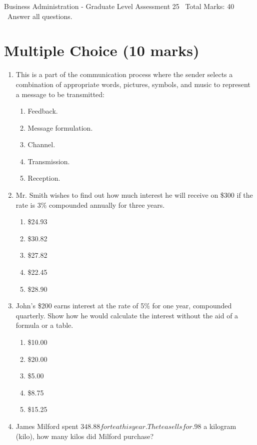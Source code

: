 \documentclass[12pt]{article}
\begin{document}
\begin{center}
Business Administration - Graduate Level Assessment 25 \
Total Marks: 40 \
Answer all questions.
\end{center}

\section*{Multiple Choice (10 marks)}
\begin{enumerate}[label=\arabic*.]
\item This is a part of the communication process where the sender selects a combination of appropriate words, pictures, symbols, and music to represent a message to be transmitted:
\begin{enumerate}[label=(\alph*)]
    \item Feedback.
    \item Message formulation.
    \item Channel.
    \item Transmission.
    \item Reception.
\end{enumerate}
\item Mr. Smith wishes to find out how much interest he will receive on \$300 if the rate is 3\% compounded annually for three years.
\begin{enumerate}[label=(\alph*)]
    \item \$24.93
    \item \$30.82
    \item \$27.82
    \item \$22.45
    \item \$28.90
\end{enumerate}
\item John's \$200 earns interest at the rate of 5\% for one year, compounded quarterly. Show how he would calculate the interest without the aid of a formula or a table.
\begin{enumerate}[label=(\alph*)]
    \item \$10.00
    \item \$20.00
    \item \$5.00
    \item \$8.75
    \item \$15.25
\end{enumerate}
\item James Milford spent $348.88 for tea this year. The tea sells for $.98 a kilogram (kilo), how many kilos did Milford purchase?
\begin{enumerate}[label=(\alph*)]

\end{enumerate}
\end{enumerate}
\end{document}
